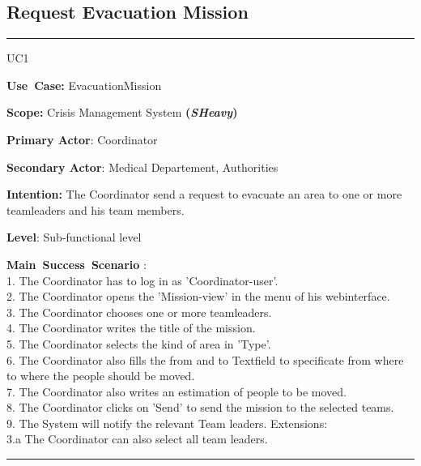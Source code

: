 \subsection{Request Evacuation Mission}
\vspace{0.5cm}
\hrule
\vspace{0.5cm}
\begin{lyxlist}{UC1}
\small{
\item [\textbf{Use~Case:}] EvacuationMission
\item [\textbf{Scope:}] Crisis Management System \textbf{(\emph{SHeavy})}
\item [\textbf{Primary Actor}:] Coordinator
\item [\textbf{Secondary Actor}:] Medical Departement, Authorities
\item [\textbf{Intention:}]The Coordinator send a request to evacuate an area
to one or more teamleaders and his team members.
\item [\textbf{Level}:]Sub-functional level
\item [\textbf{Main~Success~Scenario}]:\\
1. The Coordinator has to log in as 'Coordinator-user'.\\
2. The Coordinator opens the 'Mission-view' in the menu of his webinterface.\\
3. The Coordinator chooses one or more teamleaders.\\
4. The Coordinator writes the title of the mission.\\
5. The Coordinator selects the kind of area in 'Type'.\\
6. The Coordinator also fills the from and to Textfield to specificate from where to where
the people should be moved.\\
7. The Coordinator also writes an estimation of people to be moved.\\
8. The Coordinator clicks on 'Send' to send the mission to the selected
teams.\\
9. The System will notify the relevant Team leaders.
Extensions:\\
	3.a The Coordinator can also select all team leaders.\\
}
\end{lyxlist}
\hrule 
\vspace{0.5cm} 

